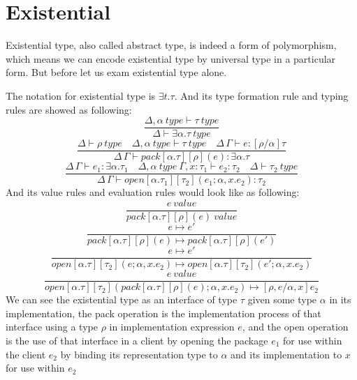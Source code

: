 \documentclass{article}
\begin{document}
\section{Existential}
Existential type, also called abstract type, is indeed a form of polymorphism, which means we can encode existential type by universal type in a particular form. But before let us exam existential type alone.


The notation for existential type is $\exists t.\tau$. And its type formation rule and typing rules are showed as following:
\begin{equation*}
\frac{\Delta, \alpha \  type \vdash \tau \ type}
{\Delta \vdash \exists \alpha.\tau\ type}
\end{equation*}
\begin{equation*}
\frac{\Delta \vdash \rho \ type \quad \Delta, \alpha \ type \vdash \tau \ type \quad \Delta\, \Gamma \vdash e : [\rho/\alpha]\tau}
{\Delta\,\Gamma \vdash pack[\alpha.\tau][\rho](e):\exists \alpha.\tau}
\end{equation*}
\begin{equation*}
\frac{\Delta\,\Gamma \vdash e_{1}:\exists \alpha.\tau_{1} \quad \Delta, \alpha \ type\ \Gamma, x:\tau_{1} \vdash e_{2}:\tau_{2} \quad \Delta \vdash \tau_{2}\ type}
{\Delta\,\Gamma \vdash open[\alpha.\tau_{1}][\tau_{2}](e_{1};\alpha,x.e_{2}):\tau_{2}}
\end{equation*}
And its value rules and evaluation rules would look like as following:
\begin{equation*}
\frac{e\ value}{pack[\alpha.\tau][\rho](e)\ value}
\end{equation*}
\begin{equation*}
\frac{e \mapsto e'}
{pack[\alpha.\tau][\rho](e) \mapsto pack[\alpha.\tau][\rho](e')}
\end{equation*}
\begin{equation*}
\frac{e \mapsto e'}
{open[\alpha.\tau][\tau_{2}](e;\alpha,x.e_{2}) \mapsto open[\alpha.\tau][\tau_{2}](e';\alpha,x.e_{2})}
\end{equation*}
\begin{equation*}
\frac{e \ value}
{open[\alpha.\tau][\tau_{2}](pack[\alpha.\tau][\rho](e);\alpha,x.e_{2}) \mapsto [\rho,e/\alpha,x]e_{2}}
\end{equation*}
We can see the existential type as an interface of type $\tau$ given some type $\alpha$ in its implementation, the pack operation is the implementation process of that interface using a type $\rho$ in implementation expression $e$, and the open operation is the use of that interface in a client by opening the package $e_{1}$ for use within the client $e_{2}$ by binding its representation type to $\alpha$ and its implementation to $x$ for use within $e_{2}$
\end{document}
